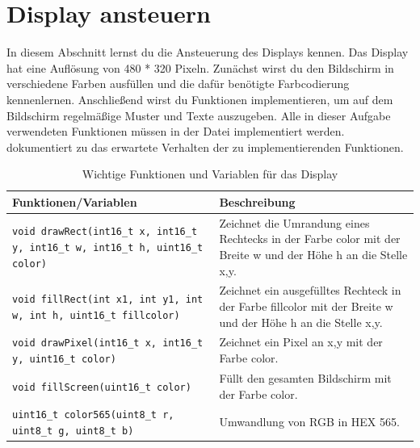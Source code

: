 \section{\ExercisePrefixEmbeddedC Display ansteuern \optional}
In diesem Abschnitt lernst du die Ansteuerung des Displays kennen.
Das Display hat eine Auflösung von 480 * 320 Pixeln.
Zunächst wirst du den Bildschirm in verschiedene Farben ausfüllen und die dafür benötigte Farbcodierung kennenlernen.
Anschließend wirst du Funktionen implementieren, um auf dem Bildschirm regelmäßige Muster und Texte auszugeben.
Alle in dieser Aufgabe verwendeten Funktionen müssen in der Datei  implementiert werden. 
 dokumentiert zu das erwartete Verhalten der zu implementierenden Funktionen.
%
\begin{table}
	\centering
	\caption{Wichtige Funktionen und Variablen für das Display}
	\label{tab:displayFunctions}
	\begin{tabular}{p{7cm}p{7cm}}
        \toprule
		\textbf{Funktionen/Variablen} & \textbf{Beschreibung} \\
        \midrule
        \lstinline|void drawRect(int16_t x, int16_t y, int16_t w, int16_t h, uint16_t color)|
        & Zeichnet die Umrandung eines Rechtecks in der Farbe color mit der Breite w und der Höhe h an die Stelle x,y. \\ \hline
		\lstinline|void fillRect(int x1, int y1, int w, int h, uint16_t fillcolor)|
        & Zeichnet ein ausgefülltes Rechteck in der Farbe fillcolor mit der Breite w und der Höhe h an die Stelle x,y. \\ \hline
		\lstinline|void drawPixel(int16_t x, int16_t y, uint16_t color)|
        & Zeichnet ein Pixel an x,y mit der Farbe color. \\ \hline
		\lstinline|void fillScreen(uint16_t color)| 
        & Füllt den gesamten Bildschirm mit der Farbe color. \\ \hline
		\lstinline|uint16_t color565(uint8_t r, uint8_t g, uint8_t b)|
        & Umwandlung von RGB in HEX 565. \\
        \bottomrule
	\end{tabular}
\end{table}

